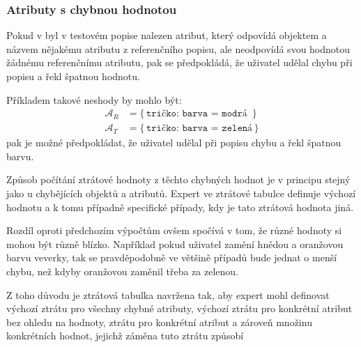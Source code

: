 \subsubsection{Atributy s chybnou hodnotou}
Pokud v byl v testovém popise nalezen atribut, který odpovídá objektem a názvem nějakému atributu z referenčního popisu,
ale neodpovídá svou hodnotou žádnému referenčnímu atributu, pak se předpokládá, že uživatel udělal chybu při popisu a řekl špatnou hodnotu.

Příkladem takové neshody by mohlo být:
\begin{align*}
	\mathcal{A}_{R} & = \bigl\{ \, \texttt{tričko: barva = modrá } \, \bigr\} \\
	\mathcal{A}_{T} & = \bigl\{ \, \texttt{tričko: barva = zelená} \, \bigr\}
\end{align*}
pak je možné předpokládat, že uživatel udělal při popisu chybu a řekl špatnou barvu.

Způsob počítání ztrátové hodnoty z těchto chybných hodnot je v principu stejný jako u chybějících objektů a atributů.
Expert ve ztrátové tabulce definuje výchozí hodnotu a k tomu případně specifické případy, kdy je tato ztrátová hodnota jiná.

Rozdíl oproti předchozím výpočtům ovšem spočívá v tom, že různé hodnoty si mohou být různě blízko.
Například pokud uživatel zamění hnědou a oranžovou barvu veverky, tak se pravděpodobně ve většině případů bude jednat o menší chybu,
než kdyby oranžovou zaměnil třeba za zelenou.

Z toho důvodu je ztrátová tabulka navržena tak, aby expert mohl definovat výchozí ztrátu pro všechny chybné atributy,
výchozí ztrátu pro konkrétní atribut bez ohledu na hodnoty, ztrátu pro konkrétní atribut a zároveň množinu konkrétních hodnot, jejichž záměna tuto ztrátu způsobí


